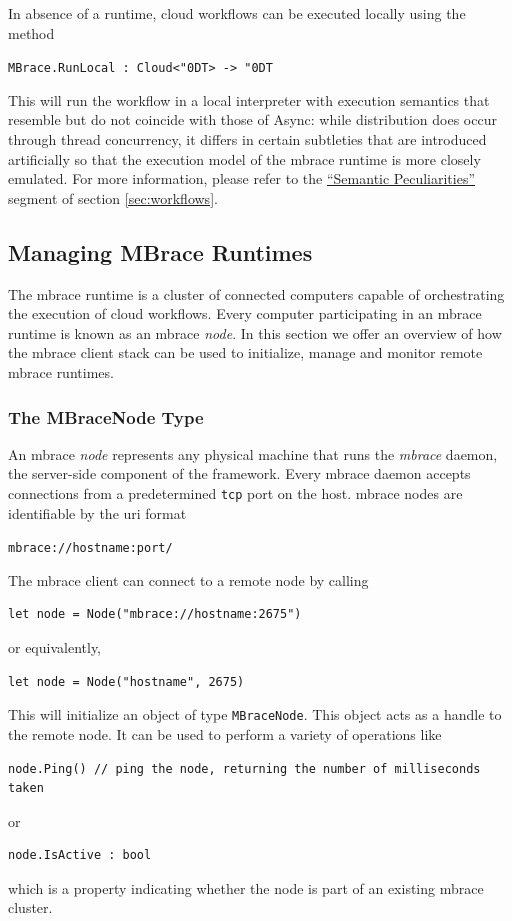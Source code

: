 \documentclass[9pt,a4paper]{article}
\newcommand{\mbrace}{mbrace}
\newcommand{\Mbrace}{\mbrace}
\newcommand{\TitularMbrace}{MBrace}
\newcommand{\centertt}[1]{\begin{center}\texttt{#1}\end{center}}
\newcommand{\uq}{\char"0D}
\begin{document}
In absence of a runtime, cloud workflows can be executed locally using the method
%
\centertt{MBrace.RunLocal : Cloud<\uq{}T> -> \uq{}T}
%
This will run the workflow in a local interpreter with execution semantics that resemble
but do not coincide with those of Async: while distribution does occur through thread 
concurrency, it differs in certain subtleties that are introduced artificially so that 
the execution model of the \mbrace{} runtime is more closely emulated.
For more information, please refer to the \href{peculiarities}{``Semantic Peculiarities''}
segment of section \ref{sec:workflows}.

\subsection{Managing \TitularMbrace{} Runtimes}

The \mbrace{} runtime is a cluster of connected computers capable of orchestrating the execution
of cloud workflows. Every computer participating in an \mbrace{} runtime is known as an \mbrace{}
\emph{node}. In this section we offer an overview of how the \mbrace{} client stack can be
used to initialize, manage and monitor remote \mbrace{} runtimes.

\subsubsection*{The MBraceNode Type}

An \mbrace{} \emph{node} represents any physical machine that runs the \emph{\mbrace{}} daemon, 
the server-side component of the framework. Every \mbrace{} daemon accepts connections from a predetermined 
\texttt{tcp} port on the host. \Mbrace{} nodes are identifiable by the uri format
\centertt{mbrace://hostname:port/}
The \mbrace{} client can connect to a remote node by calling
\begin{lstlisting}
let node = Node("mbrace://hostname:2675")
\end{lstlisting}
or equivalently,
\begin{lstlisting}
let node = Node("hostname", 2675)
\end{lstlisting}
This will initialize an object of type \texttt{MBraceNode}. This object acts as a handle
to the remote node. It can be used to perform a variety of operations like
\begin{lstlisting}
node.Ping() // ping the node, returning the number of milliseconds taken
\end{lstlisting}
or
\begin{lstlisting}
node.IsActive : bool
\end{lstlisting}
which is a property indicating whether the node is part of an existing \mbrace{} cluster.
\end{document}
